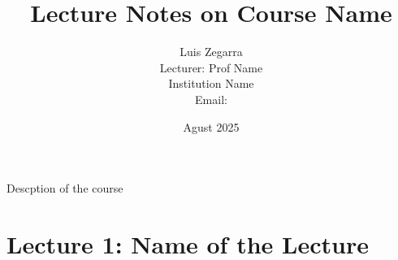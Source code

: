 \documentclass[11pt]{article}
\title{Lecture Notes on Course Name}
\author{Luis Zegarra \\ Lecturer: Prof Name \\ Institution Name \\ Email:}
\date{Agust 2025}
\begin{document}
 

\maketitle

Descption of the course

\tableofcontents

\newpage

\section{Lecture 1: Name of the Lecture}


\end{document}
